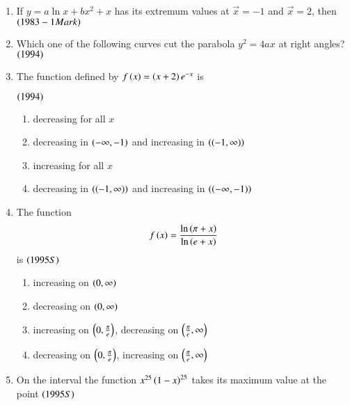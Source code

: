 \documentclass[journal,12pt,onecolumn]{IEEEtran}
\theoremstyle{remark}
\begin{document}
\begin{enumerate}
\item If $y=a\ln x + bx^2 +x$ has its extremum values at 
$\vec x = -1$ and $\vec x = 2$, then
\hfill$\left(1983 - 1 Mark\right)$

\begin{enumerate}
\end{enumerate}

\item Which one of the following curves cut the parabola
$y^2 = 4ax$ at right angles?
\hfill$\left(1994\right)$
\begin{enumerate}
\end{enumerate}

\item The function defined by 
$f\left(x\right) = \left(x+2\right)e^{-x}$ is

\hfill$\left(1994\right)$
\begin{enumerate}
	\item decreasing for all $x$
	\item decreasing in $\left(-\infty, -1\right)$ and increasing
		in $\left((-1, \infty)\right)$
        \item increasing for all $x$
	\item decreasing in $\left((-1, \infty)\right)$ and increasing
		in $\left((-\infty, -1)\right)$
\end{enumerate}

\item The function 
\begin{align*}
		f\left(x\right) =\frac{\ln \left(\pi + x\right)}{\ln \left(e + x\right)}
\end{align*} is
\hfill$\left(1995S\right)$

\begin{enumerate}
	\item increasing on $\left(0, \infty\right)$
	\item decreasing on $\left(0, \infty\right)$
	\item increasing on $\left(0, \frac{\pi}{e}\right)$,
		decreasing on $\left(\frac{\pi}{e}, \infty\right)$
	\item decreasing on $\left(0, \frac{\pi}{e}\right)$,
		increasing on $\left(\frac{\pi}{e}, \infty\right)$
\end{enumerate}

\item On the interval  the function $x^{25}\left(1-x\right)^{25}$
takes its maximum value at the point 
\hfill$\left(1995S\right)$
\end{enumerate}
\end{document}
